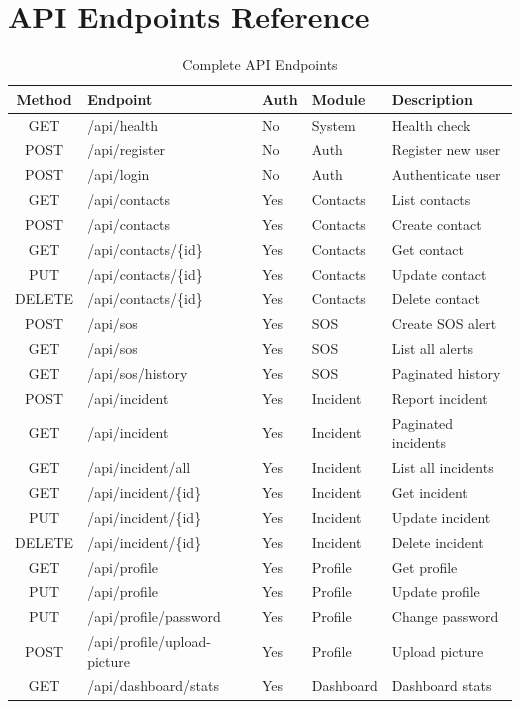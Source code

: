 \chapter{API Endpoints Reference}

\begin{table}[H]
  \centering
  \caption{Complete API Endpoints}
  \label{tab:api-endpoints}
  \begin{tabularx}{\textwidth}{@{}c l l l X@{}}
    \toprule
    \textbf{Method} & \textbf{Endpoint} & \textbf{Auth} & \textbf{Module} & \textbf{Description} \\
    \midrule
    GET & /api/health & No & System & Health check \\
    POST & /api/register & No & Auth & Register new user \\
    POST & /api/login & No & Auth & Authenticate user \\
    GET & /api/contacts & Yes & Contacts & List contacts \\
    POST & /api/contacts & Yes & Contacts & Create contact \\
    GET & /api/contacts/\{id\} & Yes & Contacts & Get contact \\
    PUT & /api/contacts/\{id\} & Yes & Contacts & Update contact \\
    DELETE & /api/contacts/\{id\} & Yes & Contacts & Delete contact \\
    POST & /api/sos & Yes & SOS & Create SOS alert \\
    GET & /api/sos & Yes & SOS & List all alerts \\
    GET & /api/sos/history & Yes & SOS & Paginated history \\
    POST & /api/incident & Yes & Incident & Report incident \\
    GET & /api/incident & Yes & Incident & Paginated incidents \\
    GET & /api/incident/all & Yes & Incident & List all incidents \\
    GET & /api/incident/\{id\} & Yes & Incident & Get incident \\
    PUT & /api/incident/\{id\} & Yes & Incident & Update incident \\
    DELETE & /api/incident/\{id\} & Yes & Incident & Delete incident \\
    GET & /api/profile & Yes & Profile & Get profile \\
    PUT & /api/profile & Yes & Profile & Update profile \\
    PUT & /api/profile/password & Yes & Profile & Change password \\
    POST & /api/profile/upload-picture & Yes & Profile & Upload picture \\
    GET & /api/dashboard/stats & Yes & Dashboard & Dashboard stats \\
    \bottomrule
  \end{tabularx}
\end{table}
